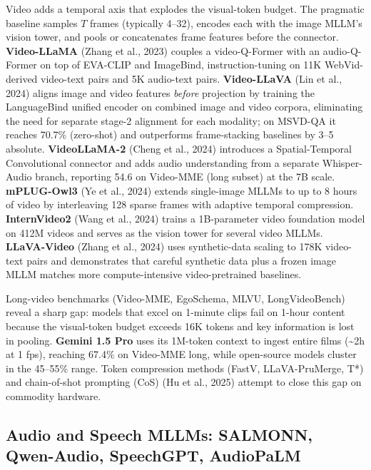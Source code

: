 Video adds a temporal axis that explodes the visual-token budget. The pragmatic baseline samples \(T\) frames (typically 4--32), encodes each with the image MLLM's vision tower, and pools or concatenates frame features before the connector. \textbf{Video-LLaMA} (Zhang et al., 2023) couples a video-Q-Former with an audio-Q-Former on top of EVA-CLIP and ImageBind, instruction-tuning on 11K WebVid-derived video-text pairs and 5K audio-text pairs. \textbf{Video-LLaVA} (Lin et al., 2024) aligns image and video features \emph{before} projection by training the LanguageBind unified encoder on combined image and video corpora, eliminating the need for separate stage-2 alignment for each modality; on MSVD-QA it reaches 70.7\% (zero-shot) and outperforms frame-stacking baselines by 3--5 absolute. \textbf{VideoLLaMA-2} (Cheng et al., 2024) introduces a Spatial-Temporal Convolutional connector and adds audio understanding from a separate Whisper-Audio branch, reporting 54.6 on Video-MME (long subset) at the 7B scale. \textbf{mPLUG-Owl3} (Ye et al., 2024) extends single-image MLLMs to up to 8 hours of video by interleaving 128 sparse frames with adaptive temporal compression. \textbf{InternVideo2} (Wang et al., 2024) trains a 1B-parameter video foundation model on 412M videos and serves as the vision tower for several video MLLMs. \textbf{LLaVA-Video} (Zhang et al., 2024) uses synthetic-data scaling to 178K video-text pairs and demonstrates that careful synthetic data plus a frozen image MLLM matches more compute-intensive video-pretrained baselines.

Long-video benchmarks (Video-MME, EgoSchema, MLVU, LongVideoBench) reveal a sharp gap: models that excel on 1-minute clips fail on 1-hour content because the visual-token budget exceeds 16K tokens and key information is lost in pooling. \textbf{Gemini 1.5 Pro} uses its 1M-token context to ingest entire films (\textasciitilde2h at 1 fps), reaching 67.4\% on Video-MME long, while open-source models cluster in the 45--55\% range. Token compression methods (FastV, LLaVA-PruMerge, T*) and chain-of-shot prompting (CoS) (Hu et al., 2025) attempt to close this gap on commodity hardware.

\subsection{Audio and Speech MLLMs: SALMONN, Qwen-Audio, SpeechGPT, AudioPaLM}\label{audio-and-speech-mllms-salmonn-qwen-audio-speechgpt-audiopalm}

